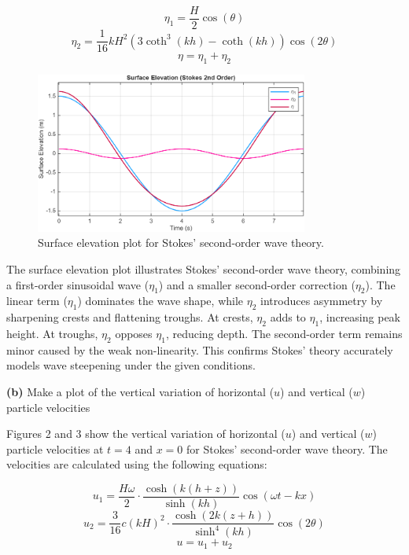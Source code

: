 \documentclass[a4paper]{article}
\begin{document}
\[\eta_1 = \frac{H}{2} \cos(\theta)\]
\[\eta_2 = \frac{1}{16} k H^2 \left(3 \coth^3(kh) - \coth(kh)\right) \cos(2\theta)\]
\[\eta = \eta_1 + \eta_2\]

\begin{figure}[H]
    \centering
    \includegraphics[width=0.8\textwidth]{CE591HW1-Q1a.png}
    \caption{\small Surface elevation plot for Stokes' second-order wave theory.}
    \label{fig:plot2a}
\end{figure}
\vspace{0.3cm}

The surface elevation plot illustrates Stokes’ second-order wave theory, combining a first-order sinusoidal wave ($\eta_1$) and a smaller second-order correction ($\eta_2$). The linear term ($\eta_1$) dominates the wave shape, while $\eta_2$ introduces asymmetry by sharpening crests and flattening troughs. At crests, $\eta_2$ adds to $\eta_1$, increasing peak height. At troughs, $\eta_2$ opposes $\eta_1$, reducing depth. The second-order term remains minor caused by the weak non-linearity. This confirms Stokes’ theory accurately models wave steepening under the given conditions.
\vspace{0.3cm}

\noindent\textbf{(b)} Make a plot of the vertical variation of horizontal (\(u\)) and vertical (\(w\)) particle velocities
\vspace{0.2cm}

Figures 2 and 3 show the vertical variation of horizontal (\(u\)) and vertical (\(w\)) particle velocities at \(t = 4\) and \(x = 0\) for Stokes' second-order wave theory. The velocities are calculated using the following equations:

\[u_1 = \frac{H \omega}{2} \cdot \frac{\cosh(k(h+z))}{\sinh(kh)} \cos(\omega t - kx)\]
\[u_2 = \frac{3}{16} c (kH)^2 \cdot \frac{\cosh(2k(z+h))}{\sinh^4(kh)} \cos(2\theta)\]
\[u = u_1 + u_2\]
\end{document}
